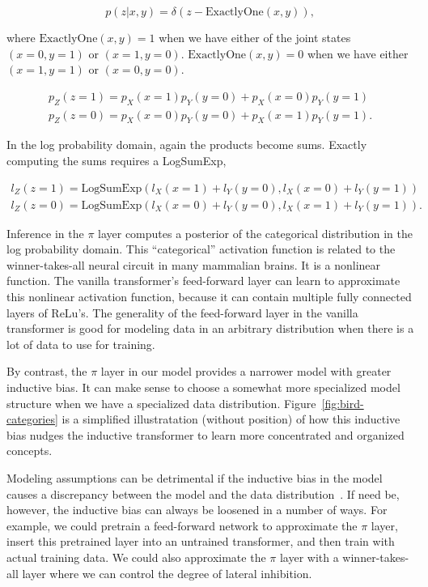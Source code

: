 \begin{equation}\label{eq:categorical-constraint}
p(z|x, y) = \delta(z - \mathrm{ExactlyOne}(x, y)),
\end{equation}

where $\mathrm{ExactlyOne}(x, y) = 1$ when we have either of the joint states $(x=0, y=1)$ or $(x=1, y=0)$. $\mathrm{ExactlyOne}(x, y) = 0$ when we have either $(x=1, y=1)$ or $(x=0, y=0)$.

\begin{align}\label{eq:probability-domain-categorical}
p_Z(z=1) = p_X(x=1)p_Y(y=0) + p_X(x=0)p_Y(y=1) \\
p_Z(z=0) = p_X(x=0)p_Y(y=0) + p_X(x=1)p_Y(y=1). \nonumber
\end{align}

In the log probability domain, again the products become sums.  Exactly computing the sums requires a LogSumExp,

\begin{align}\label{eq:log-probability-domain-categorical}
l_Z(z=1) = \mathrm{LogSumExp}(l_X(x=1) + l_Y(y=0), l_X(x=0) + l_Y(y=1)) \\
l_Z(z=0) = \mathrm{LogSumExp}(l_X(x=0) + l_Y(y=0), l_X(x=1) + l_Y(y=1)). \nonumber
\end{align}

Inference in the $\pi$ layer computes a posterior of the categorical distribution in the log probability domain. This ``categorical'' activation function is related to the winner-takes-all neural circuit in many mammalian brains.  It is a nonlinear function.  The vanilla transformer's feed-forward layer can learn to approximate this nonlinear activation function, because it can contain multiple fully connected layers of ReLu's.\cite{}  The generality of the feed-forward layer in the vanilla transformer is good for modeling data in an arbitrary distribution when there is a lot of data to use for training. 

By contrast, the $\pi$ layer in our model provides a narrower model with greater inductive bias.  It can make sense to choose a somewhat more specialized model structure when we have a specialized data distribution.  Figure~\ref{fig:bird-categories} is a simplified illustratation (without position) of how this inductive bias nudges the inductive transformer to learn more concentrated and organized concepts.


Modeling assumptions can be detrimental if the inductive bias in the model causes a discrepancy between the model and the data distribution~\cite{Latent Dirichlet Allocation}. If need be, however, the inductive bias can always be loosened in a number of ways.  For example, we could pretrain a feed-forward network to approximate the $\pi$ layer, insert this pretrained layer into an untrained transformer, and then train with actual training data.  We could also approximate the $\pi$ layer with a winner-takes-all layer where we can control the degree of lateral inhibition.


